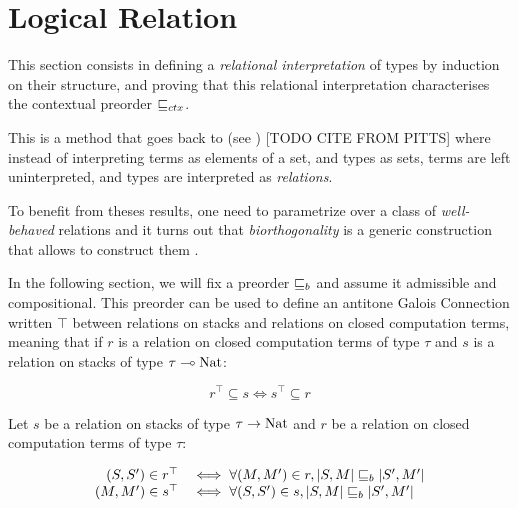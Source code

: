 \section{Logical Relation}

This section consists in defining a \emph{relational interpretation}
of types by induction on their structure, and proving that 
this relational interpretation characterises the contextual 
preorder $\sqsubseteq_{ctx}$. 

This is a method that goes back to \cite{Reynolds83} 
(see \cite{wadler1989theorems}) [TODO CITE FROM PITTS] where 
instead of interpreting terms as elements of 
a set, and types as sets, terms are left 
uninterpreted, and types are interpreted as \emph{relations}.

To benefit from theses results, one need to parametrize 
over a class of \emph{well-behaved} relations \cite{Pitts2000} 
and it turns out that \emph{biorthogonality} 
is a generic construction that allows to construct them 
\cite{mellies2005recursive}.

\vspace{1em}

In the following section, we will fix a preorder $\sqsubseteq_b$
and assume it admissible and compositional. This 
preorder can be used to define an antitone Galois Connection 
written $\top$ between relations on stacks and relations on closed 
computation terms, meaning 
that if $r$ is a relation on closed computation terms of type $\tau$ and $s$ is 
a relation on stacks of type $\tau \multimap \textnormal{Nat}$:

\begin{equation*}
    r^\top \subseteq s \iff s^\top \subseteq r
\end{equation*}

\begin{definition}
    Let $s$ be a relation on stacks of type $\tau \to \textnormal{Nat}$ 
    and $r$ be a relation on closed computation terms 
    of type $\tau$:

    \begin{equation*}
        \begin{array}{rl}
            (S,S') \in r^\top &\iff
            \forall (M,M') \in r, |S,M| \sqsubseteq_b |S',M'|\\ 
            (M,M') \in s^\top &\iff
            \forall (S,S') \in s, |S,M| \sqsubseteq_b |S',M'|
        \end{array}
    \end{equation*}
\end{definition}

